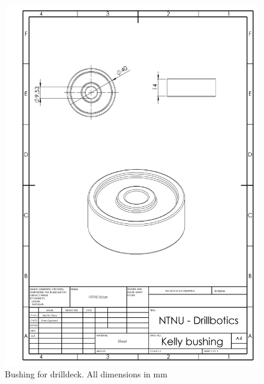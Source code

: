 \newpage
\begin{figure} [H]
\centering
\includegraphics[width=1.0\textwidth]{figures/mechdrawings/Kellybushing.JPG}
\caption{Bushing for drilldeck. All dimensions in mm} 
\label{fig:bushing}
\end{figure}

